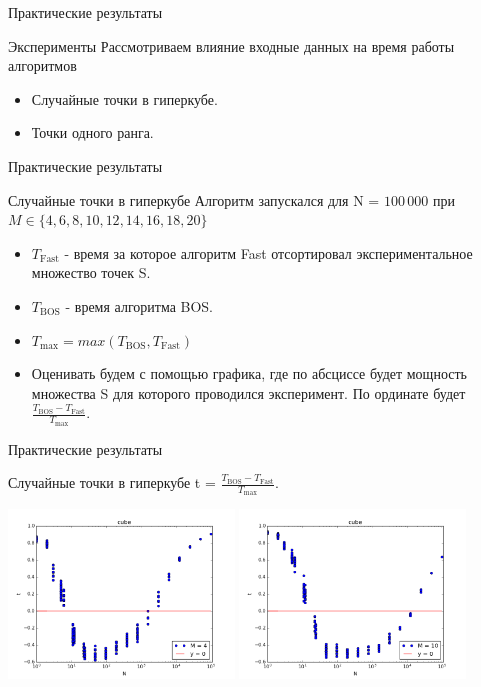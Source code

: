 \documentclass{beamer}
\begin{document}
\begin{frame}{Практические результаты}
\begin{block}{Эксперименты}
Рассмотриваем влияние входные данных на время работы алгоритмов
\begin{itemize}
\item Случайные точки в гиперкубе.
\item Точки одного ранга.
\end{itemize}
\end{block}
\end{frame}


\begin{frame}{Практические результаты}
\begin{block}{Случайные точки в гиперкубе}
Алгоритм запускался для N = $100\,000$ при $M \in \{4, 6, 8, 10, 12, 14, 16, 18, 20\}$
\begin{itemize}
\item $T_\text{Fast}$ - время за которое алгоритм Fast отсортировал экспериментальное множество точек S.
\item $T_\text{BOS}$ - время алгоритма BOS.  
\item $T_\text{max} = max (T_\text{BOS}, T_\text{Fast})$
\item Оценивать будем с помощью графика, где по абсциссе будет мощность множества S для которого проводился эксперимент. По ординате будет $\frac{T_\text{BOS} - T_\text{Fast}}{T_\text{max}}$.
\end{itemize}
\end{block}
\end{frame}

\begin{frame}{Практические результаты}
\begin{block}{Случайные точки в гиперкубе}
t = $\frac{T_\text{BOS} - T_\text{Fast}}{T_\text{max}}$.
\begin{table}[h]
\begin{center}
\includegraphics[width=6cm]{pic/cube_m=4}
\includegraphics[width=6cm]{pic/cube_m=10}
\end{center}
\end{table}
\end{block}
\end{frame}
\end{document}
